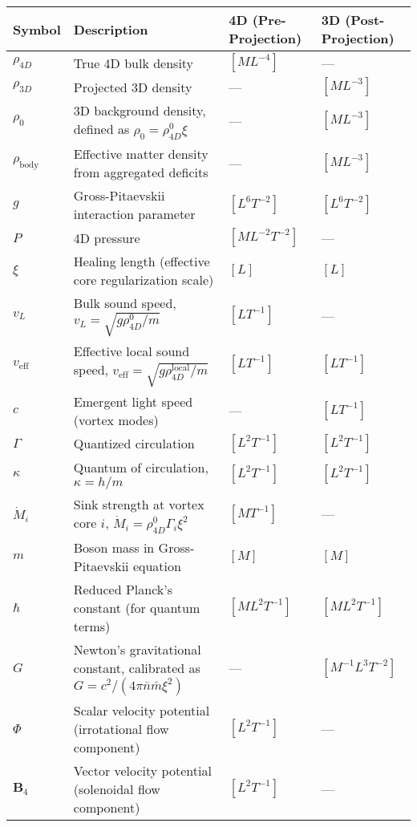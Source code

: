 \begin{table}[H]
\centering
\begin{tabularx}{\textwidth}{|l|Y|l|l|}
\hline
Symbol & Description & 4D (Pre-Projection) & 3D (Post-Projection) \\
\hline
$\rho_{4D}$ & True 4D bulk density & $[M L^{-4}]$ & --- \\
\hline
$\rho_{3D}$ & Projected 3D density & --- & $[M L^{-3}]$ \\
\hline
$\rho_0$ & 3D background density, defined as $\rho_0 = \rho_{4D}^0 \xi$ & --- & $[M L^{-3}]$ \\
\hline
$\rho_{\text{body}}$ & Effective matter density from aggregated deficits & --- & $[M L^{-3}]$ \\
\hline
$g$ & Gross-Pitaevskii interaction parameter & $[L^6 T^{-2}]$ & $[L^6 T^{-2}]$ \\
\hline
$P$ & 4D pressure & $[M L^{-2} T^{-2}]$ & --- \\
\hline
$\xi$ & Healing length (effective core regularization scale) & $[L]$ & $[L]$ \\
\hline
$v_L$ & Bulk sound speed, $v_L = \sqrt{g \rho_{4D}^0 / m}$ & $[L T^{-1}]$ & --- \\
\hline
$v_{\text{eff}}$ & Effective local sound speed, $v_{\text{eff}} = \sqrt{g \rho_{4D}^{\text{local}} / m}$ & $[L T^{-1}]$ & $[L T^{-1}]$ \\
\hline
$c$ & Emergent light speed (vortex modes) & --- & $[L T^{-1}]$ \\
\hline
$\Gamma$ & Quantized circulation & $[L^2 T^{-1}]$ & $[L^2 T^{-1}]$ \\
\hline
$\kappa$ & Quantum of circulation, $\kappa = h / m$ & $[L^2 T^{-1}]$ & $[L^2 T^{-1}]$ \\
\hline
$\dot{M}_i$ & Sink strength at vortex core $i$, $\dot{M}_i = \rho_{4D}^0 \Gamma_i \xi^2$ & $[M T^{-1}]$ & --- \\
\hline
$m$ & Boson mass in Gross-Pitaevskii equation & $[M]$ & $[M]$ \\
\hline
$\hbar$ & Reduced Planck's constant (for quantum terms) & $[M L^2 T^{-1}]$ & $[M L^2 T^{-1}]$ \\
\hline
$G$ & Newton's gravitational constant, calibrated as $G = c^2 / (4\pi \bar{n} \bar{m} \xi^2)$ & --- & $[M^{-1} L^3 T^{-2}]$ \\
\hline
$\Phi$ & Scalar velocity potential (irrotational flow component) & $[L^2 T^{-1}]$ & --- \\
\hline
$\mathbf{B}_4$ & Vector velocity potential (solenoidal flow component) & $[L^2 T^{-1}]$ & --- \\

\end{tabularx}
\end{table}
